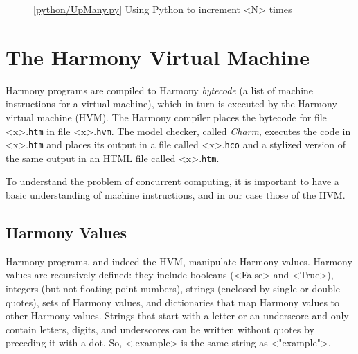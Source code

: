 \documentclass{report}
\newcommand{\harmonylink}[1]{%
[\href{https://harmony.cs.cornell.edu/#1}{\underline{#1}}]%
}
\newenvironment{code}{
\tcolorbox
}{
\endtcolorbox
}
\begin{document}
\begin{figure}
\begin{code}
\end{code}
\caption{\harmonylink{python/UpMany.py} Using Python to increment <{N}> times}
\label{fig:incmany}
\end{figure}

\chapter{The Harmony Virtual Machine}
\label{ch:harmonymachine}
%

Harmony programs are compiled to Harmony \emph{bytecode}
%
(a list of machine instructions for a virtual machine),
which in turn is executed by the Harmony virtual machine (HVM).
%
%
%
The Harmony compiler places the bytecode for file <{x}>.\texttt{htm} in
file <{x}>.\texttt{hvm}.
The model checker, called \emph{Charm}, executes the code in
<{x}>.\texttt{htm} and places its output in a file
called <{x}>.\texttt{hco} and a stylized version of the same output
in an HTML file called <{x}>.\texttt{htm}.

To understand the problem of concurrent computing, it
is important to have a basic understanding of machine instructions,
and in our case those of the HVM.

\section*{Harmony Values}

Harmony programs, and indeed the HVM,  manipulate Harmony values.
Harmony values are recursively defined:
they include booleans (<{False}> and <{True}>),
integers (but not floating point numbers),
strings (enclosed by single or double quotes),
sets of Harmony values, and dictionaries
%
that map Harmony values to other Harmony values.
Strings that start with a letter or an underscore and only contain
letters, digits, and underscores can be written without quotes by
preceding it with a dot.  So, <{.example}> is the same string
as <{"example"}>.
\end{document}
